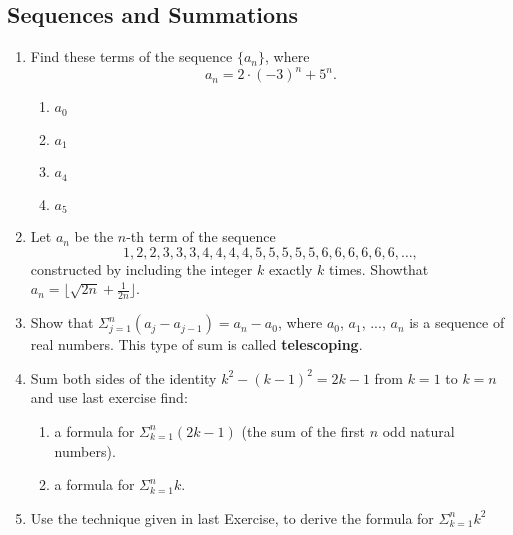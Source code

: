 \documentclass{../../cls/sig-alternate-05-2015}
\begin{document}
\subsection{Sequences and Summations}
\begin{enumerate}
\item Find these terms of the sequence $\{a_n\}$, where \begin{equation}
    a_n = 2 \cdot (-3)^n + 5^n.
\end{equation}\begin{enumerate}
    \item $a_0$
    \item $a_1$
    \item $a_4$
    \item $a_5$
\end{enumerate}

\item Let $a_n$ be the $n$-th term of the sequence \begin{equation}
    1, 2, 2, 3, 3, 3, 4, 4, 4, 4, 5, 5, 5, 5, 5, 6, 6, 6, 6, 6, 6, \ldots,
\end{equation} constructed by including the integer $k$ exactly $k$ times. Showthat $a_n = \lfloor \sqrt{2n}+ \frac{1}{2n} \rfloor$.

\item Show that $\Sigma^n_{j = 1}(a_j - a_{j - 1}) = a_n - a_0$, where
$a_0$, $a_1$, ..., $a_n$ is a sequence of real numbers. This type of sum is called \textbf{telescoping}.

\item Sum both sides of the identity $k^2 - (k - 1)^2 = 2k - 1$ from $k = 1$ to $k = n$ and use last exercise find:
\begin{enumerate}
    \item a formula for $\Sigma^n_{k = 1}(2k - 1)$ (the sum of the first $n$ odd natural numbers).
    \item a formula for $\Sigma^n_{k = 1} k$.
\end{enumerate}

\item Use the technique given in last Exercise, to derive the formula for $\Sigma^n_{k = 1} k^2$

\end{enumerate}
\end{document}
